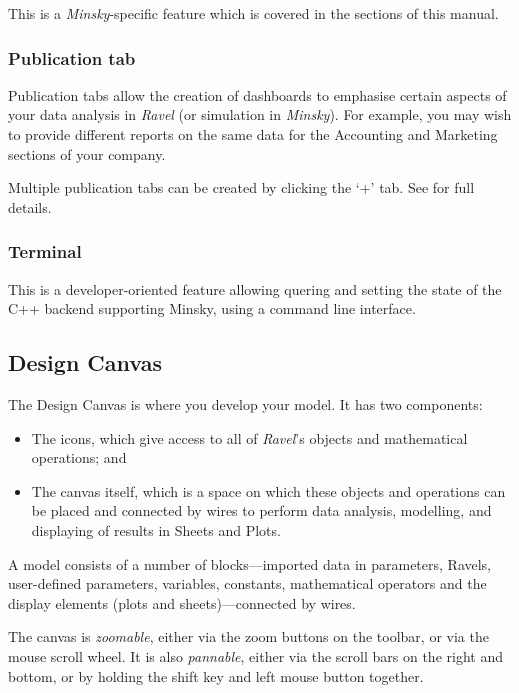 This is a \emph{Minsky}-specific feature which is covered in the  sections of this manual.

\subsubsection{Publication tab}

Publication tabs allow the creation of dashboards to emphasise certain
aspects of your data analysis in \emph{Ravel }(or simulation in \emph{Minsky}).
For example, you may wish to provide different reports on the same
data for the Accounting and Marketing sections of your company.

Multiple publication tabs can be created by clicking the `+' tab.
See  for full details.

\subsubsection{Terminal}
\label{terminal}

This is a developer-oriented feature allowing quering and setting the
state of the C++ backend supporting Minsky, using a command line interface.

\subsection{Design Canvas}

\label{DesignCanvas}\label{tabs:Wiring}

The Design Canvas is where you develop your model. It has two components:
\begin{itemize}
\item The  icons, which give access to all of
\emph{Ravel}'s objects and mathematical operations; and
\item The canvas itself, which is a space on which these objects and operations
can be placed and connected by wires to perform data analysis, modelling,
and displaying of results in Sheets and Plots.
\end{itemize}
A model consists of a number of blocks---imported data in parameters,
Ravels, user-defined parameters, variables, constants, mathematical
operators and the display elements (plots and sheets)---connected
by wires.

The canvas is \emph{zoomable}, either via the zoom buttons on the
toolbar, or via the mouse scroll wheel. It is also \emph{pannable},
either via the scroll bars on the right and bottom, or by holding
the shift key and left mouse button together. 

